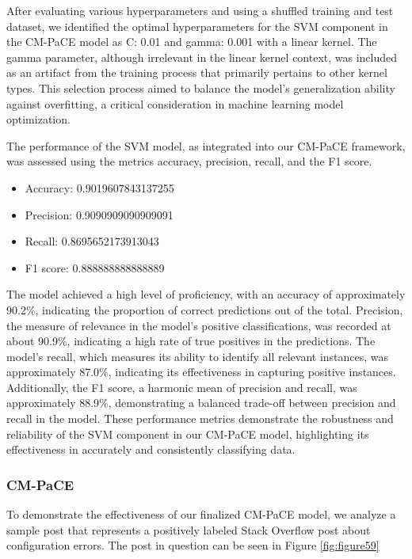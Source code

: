 \documentclass[english,bachelor]{swsLeipzig}
\begin{document}
After evaluating various hyperparameters and using a shuffled training and test dataset, we identified 
the optimal hyperparameters for the SVM component in the CM-PaCE model as C: 0.01 and gamma: 0.001 with a linear kernel. The gamma parameter, although irrelevant in the linear kernel context, was included as an artifact from the training process that primarily pertains to other kernel types. This selection process aimed to balance the model's generalization ability against overfitting, a critical consideration in machine learning model optimization.

The performance of the SVM model, as integrated into our CM-PaCE framework, was assessed using the  metrics accuracy, precision, recall, and the F1 score.

\begin{itemize}
  \item Accuracy: 0.9019607843137255
  \item Precision: 0.9090909090909091
  \item Recall: 0.8695652173913043
  \item F1 score: 0.888888888888889
\end{itemize}

The model achieved a high level of proficiency, with an accuracy of approximately 90.2\%, indicating the 
proportion of correct predictions out of the total. Precision, the measure of relevance in the model's positive classifications, was recorded at about 90.9\%, indicating a high rate of true positives in the predictions. The model's recall, which measures its ability to identify all relevant instances, was approximately 87.0\%, indicating its effectiveness in capturing positive instances. Additionally, the F1 score, a harmonic mean of precision and recall, was approximately 88.9\%, demonstrating a balanced trade-off between precision and recall in the model. These performance metrics demonstrate the robustness and reliability of the SVM component in our CM-PaCE model, highlighting its effectiveness in accurately and consistently classifying data.

\subsubsection{CM-PaCE}

To demonstrate the effectiveness of our finalized CM-PaCE model, we analyze a sample post that represents a positively labeled Stack Overflow post about configuration errors. The post in question can be seen in Figure \ref{fig:figure59}
\end{document}
